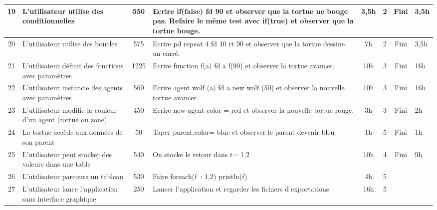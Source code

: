 {\begin{longtable}[c]{|c|p{1.3cm}|c|p{3.5cm}|*{3}{c|}p{0.7cm}|}
\hline
19 & L'utilisateur utilise des conditionnelles & 550 & Ecrire if(false) { fd 90 } et observer que la tortue ne bouge pas. Refaire le même test avec if(true) et observer que la tortue bouge. & 3,5h & 2 & Fini & 3,5h \\
\hline
20 & L'utilisateur utilise des boucles & 575 & Ecrire pd repeat 4 { fd 40 rt 90 } et observer que la tortue dessine un carré. & 7h & 2 & Fini & 3,5h \\
\hline
21 & L'utilisateur définit des fonctions avec paramètres & 1225 & Ecrire function f(a) { fd a } f(90) et observer la tortue avancer. & 10h & 3 & Fini & 16h \\
\hline
22 & L'utilisateur instancie des agents avec paramètres & 560 & Ecrire agent wolf (a) { fd a } new wolf (50) et observer la nouvelle tortue avancer. & 10h & 3 & Fini & 16h \\
\hline
23 & L'utilisateur modifie la couleur d'un agent (tortue ou zone) & 450 & Ecrire new agent { color = red } et observer la nouvelle tortue rouge. & 3h & 3 & Fini & 2h \\
\hline
24 & La tortue accède aux données de son parent & 50 & Taper parent.color= blue et observer le parent devenir bleu & 1h & 5 & Fini & 1h \\
\hline
25 & L'utilisateur peut stocker des valeurs dans une table & 540 & On stocke le retour dans t= {1,2} & 10h & 4 & Fini & 9h \\
\hline
26 & L'utilisateur parcours un tableau & 530 & Faire foreach(f~: {1,2}) println(f) & 4h & 5 &  &  \\
\hline
27 & L'utilisateur lance l'application sans interface graphique & 250 & Lancer l'application et regarder les fichiers d'exportations & 16h & 5 & &  \\
\hline
\end{longtable}}
